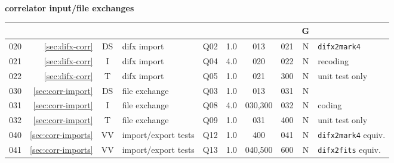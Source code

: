 \small
\textbf{correlator input/file exchanges}\hfill\break
\noindent
\begin{tabular}{r|r|c|l|c|c|c|c|c|l}
\hline
\usebox{\NM}&\usebox{\REF}&\usebox{\WW}&\usebox{\TPC}&\usebox{\ST}&\usebox{\EFF}&\usebox{\PRD}&\usebox{\SCC}&G&\usebox{\CMTS}\\
\hline
\hline
020&\ref{sec:difx-corr}            &DS& difx import          & Q02 & 1.0 & 013     & 021 & N & \texttt{difx2mark4} \\
021&\ref{sec:difx-corr}            &I & difx import          & Q04 & 4.0 & 020     & 022 & N & recoding \\
022&\ref{sec:difx-corr}            &T & difx import          & Q05 & 1.0 & 021     & 300 & N & unit test only \\
030&\ref{sec:corr-import}          &DS& file exchange        & Q03 & 1.0 & 013     & 031 & N &  \\
031&\ref{sec:corr-import}          &I & file exchange        & Q08 & 4.0 & 030,300 & 032 & N & coding \\
032&\ref{sec:corr-import}          &T & file exchange        & Q09 & 1.0 & 031     & 400 & N & unit test only \\
040&\ref{sec:corr-imports}         &VV& import/export tests  & Q12 & 1.0 & 400     & 041 & N & \texttt{difx2mark4} equiv. \\
041&\ref{sec:corr-imports}         &VV& import/export tests  & Q13 & 1.0 & 040,500 & 600 & N & \texttt{difx2fits} equiv. \\
\hline
\end{tabular}\vspace{6mm}

